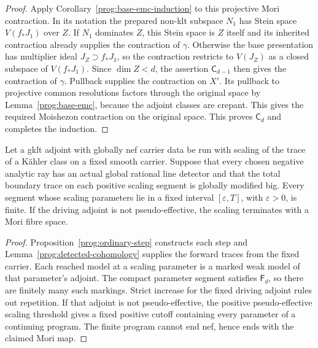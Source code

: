 \begin{proof}
Apply Corollary~\ref{prog:base-emc-induction} to this projective
Mori contraction. In its notation the prepared non-klt subspace
$N_1$ has Stein space $V(f_*J_1)$ over $Z$. If $N_1$ dominates
$Z$, this Stein space is $Z$ itself and its inherited contraction
already supplies the contraction of $\gamma$. Otherwise the base
presentation has multiplier ideal $J_Z\supset f_*J_1$, so the
contraction restricts to $V(J_Z)$ as a closed subspace of
$V(f_*J_1)$. Since $\dim Z<d$, the assertion $\mathsf C_{d-1}$
then gives the contraction of $\gamma$. Pullback supplies the
contraction on $X'$. Its pullback to projective common resolutions
factors through the original space by Lemma~\ref{prog:base-emc},
because the adjoint classes are crepant. This gives the required
Moishezon contraction on the original space.
This proves $\mathsf C_d$ and completes the induction.
\end{proof}

\begin{corollary}
\label{prog:detected-positive-truncation}
Let a gklt adjoint with globally nef carrier data be run with scaling
of the trace of a K\"ahler class on a fixed smooth carrier. Suppose
that every chosen negative analytic ray has an actual global rational
line detector and that the total boundary trace on each positive
scaling segment is globally modified big. Every segment whose scaling
parameters lie in a fixed interval $[\varepsilon,T]$, with
$\varepsilon>0$, is finite. If the driving adjoint is not
pseudo-effective, the scaling terminates with a Mori fibre space.
\end{corollary}
\begin{proof}
Proposition~\ref{prog:ordinary-step} constructs each step and
Lemma~\ref{prog:detected-cohomology} supplies the forward traces from
the fixed carrier. Each reached model at a scaling parameter is a
marked weak model of that parameter's adjoint. The compact parameter
segment satisfies $\mathsf F_d$, so there are finitely many such
markings. Strict increase for the fixed driving adjoint rules out
repetition. If that adjoint is not pseudo-effective, the positive
pseudo-effective scaling threshold gives a fixed positive cutoff
containing every parameter of a continuing program. The finite
program cannot end nef, hence ends with the claimed Mori map.
\end{proof}
